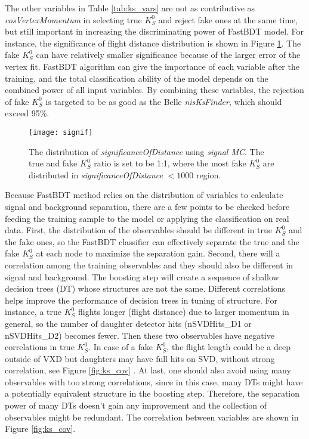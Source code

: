 The other variables in Table \ref{tab:ks_vars} are not as contributive as  \textit{cosVertexMomentum} in selecting true $K_S^0$ and reject fake ones at the same time, but still important in increasing the discriminating power of FastBDT model. For instance, the significance of flight distance distribution is shown in Figure \ref{fig:signi}. The fake $K_S^0$ can have relatively smaller significance because of the larger error of the vertex fit. FastBDT algorithm can give the importance of each variable after the training, and the total classification ability of the model depends on the combined power of all input variables. By combining these variables, the rejection of fake $K_S^0$ is targeted to be as good as the Belle \textit{nis\textit{KsFinder}}, which should exceed 95\%. 
\begin{figure}[htbp]
	\centering
	\texttt{[image: signif]}
	\caption{The distribution of \textit{significanceOfDistance} using \textit{signal MC}. The true and fake $K_S^0$ ratio is set to be 1:1, where the most fake $K_S^0$ are distributed in \textit{significanceOfDistance} $<1000$ region.}
	\label{fig:signi}
\end{figure}


Because FastBDT method relies on the distribution of variables to calculate signal and background separation, there are a few points to be checked before feeding the training sample to the model or applying the classification on real data. First, the distribution of the observables should be different in true $K_S^0$ and the fake ones, so the FastBDT classifier can effectively separate the true and the fake $K_S^0$ at each node to maximize the separation gain. Second, there will a correlation among the training observables and they should also be different in signal and background. The boosting step will create a sequence of shallow decision trees (DT) whose structures are not the same. Different correlations helps improve the performance of decision trees in tuning of structure. For instance, a true $K_S^0$ flights longer (flight distance) due to larger momentum in general, so the number of daughter detector hits (nSVDHits\_D1 or nSVDHits\_D2) becomes fewer. Then these two observables have negative correlations in true $K_S^0$. In case of a fake $K_S^0$, the flight length could be a deep outside of VXD  but daughters may have full hits on SVD, without strong correlation, see Figure  \ref{fig:ks_cov} . At last, one should also avoid using many observables with too strong correlations, since in this case, many DTs might have a potentially equivalent structure in the boosting step. Therefore, the separation power of many DTs doesn't gain any improvement and the collection of observables might be redundant. The correlation between variables are shown in Figure \ref{fig:ks_cov}.

